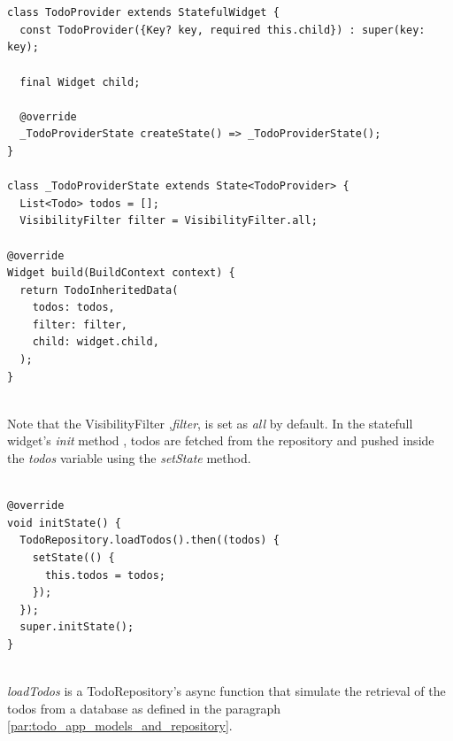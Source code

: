 \mbox{}\\
\begin{code}
 \mbox{}

\begin{verbatim}

class TodoProvider extends StatefulWidget {
  const TodoProvider({Key? key, required this.child}) : super(key: key);

  final Widget child;

  @override
  _TodoProviderState createState() => _TodoProviderState();
}

class _TodoProviderState extends State<TodoProvider> {
  List<Todo> todos = [];
  VisibilityFilter filter = VisibilityFilter.all;

@override
Widget build(BuildContext context) {
  return TodoInheritedData(
    todos: todos,
    filter: filter,
    child: widget.child,
  );
}
\end{verbatim}
\end{code}
\mbox{}\\
Note that the VisibilityFilter ,\textit{filter}, is set as \textit{all} by default.
In the statefull widget's \textit{init} method , todos are fetched from the repository and pushed inside the \textit{todos} variable using the \textit{setState} method.
\mbox{}\\
\begin{code}
 \mbox{}

\begin{verbatim}

@override
void initState() {
  TodoRepository.loadTodos().then((todos) {
    setState(() {
      this.todos = todos;
    });
  });
  super.initState();
}
\end{verbatim}
\end{code}
\mbox{}\\
\textit{loadTodos }is a TodoRepository’s async function that simulate the retrieval of the todos from a database as defined in the paragraph \ref{par:todo_app_models_and_repository}.

